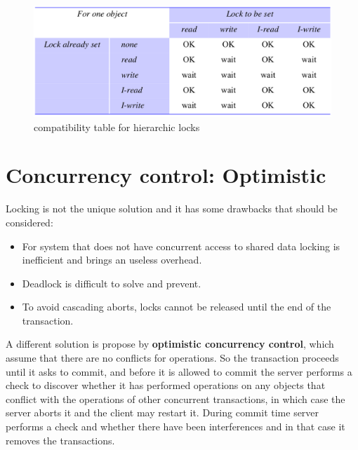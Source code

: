 \begin{itemize}
    \begin{figure}[!h]
    \centering
    \includegraphics[width=.80\linewidth]{images/TransactionAndConcurrencyControl/lockCompatibilityHierarchic.png}
    \caption{compatibility table for hierarchic locks}
\end{figure}
    
\end{itemize}

\section{Concurrency control: Optimistic}
Locking is not the unique solution and it has some drawbacks that should be considered:
\begin{itemize}
    \item For system that does not have concurrent access to shared data locking is inefficient and brings an useless overhead.
    \item Deadlock is difficult to solve and prevent.
    \item To avoid cascading aborts, locks cannot be released until the end of the transaction.
\end{itemize}
A different solution is propose by \textbf{optimistic concurrency control}, which assume that there are no conflicts for operations. So the transaction proceeds until it asks to commit, and before it is allowed to commit the server performs a check to discover whether it has performed operations on any objects that conflict with the operations of other concurrent transactions, in which case the server aborts it and the client may restart it.
During commit time server performs a check and whether there have been interferences and in that case it removes the transactions.

